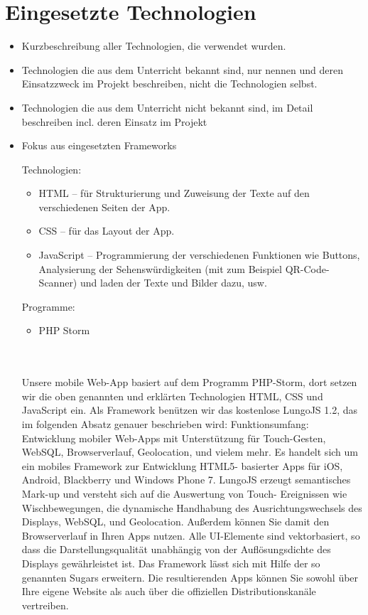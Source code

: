 \chapter{Eingesetzte Technologien}
\begin{itemize}
	\item Kurzbeschreibung aller Technologien, die verwendet wurden.
	\item Technologien die aus dem Unterricht bekannt sind, nur nennen und deren  Einsatzzweck im Projekt beschreiben, nicht die Technologien selbst.
	\item Technologien die aus dem Unterricht nicht bekannt sind, im Detail beschreiben incl. deren Einsatz im Projekt
	\item Fokus aus eingesetzten Frameworks
	
	
	Technologien:
	\begin{itemize}
	\item HTML – für Strukturierung und Zuweisung der Texte auf den verschiedenen Seiten der App.
	\item CSS – für das Layout der App.
	\item JavaScript – Programmierung der verschiedenen Funktionen wie Buttons, Analysierung der Sehenswürdigkeiten (mit zum Beispiel QR-Code-Scanner) und laden der Texte und Bilder dazu, usw.\\
	\end{itemize}

	Programme:
	\begin{itemize}
	\item PHP Storm\\\\\\
	\end{itemize}
	
	Unsere mobile Web-App basiert auf dem Programm PHP-Storm, dort setzen wir die oben genannten und erklärten Technologien HTML, CSS und JavaScript ein. Als Framework benützen wir das kostenlose LungoJS 1.2, das im folgenden Absatz genauer beschrieben wird:
	Funktionsumfang: Entwicklung mobiler Web-Apps mit Unterstützung für Touch-Gesten, WebSQL, Browserverlauf, Geolocation, und vielem mehr.
	Es handelt sich um ein mobiles Framework zur Entwicklung HTML5- basierter Apps für iOS, Android, Blackberry und Windows Phone 7. LungoJS erzeugt semantisches Mark-up und versteht sich auf die Auswertung von Touch- Ereignissen wie Wischbewegungen, die dynamische Handhabung des Ausrichtungswechsels des Displays, WebSQL, und Geolocation. Außerdem können Sie damit den Browserverlauf in Ihren Apps nutzen.
	Alle UI-Elemente sind vektorbasiert, so dass die Darstellungsqualität unabhängig von der Auflösungsdichte des Displays gewährleistet ist. Das Framework lässt sich mit Hilfe der so genannten Sugars erweitern. Die resultierenden Apps können Sie sowohl über Ihre eigene Website als auch über die offiziellen Distributionskanäle vertreiben.
	
\end{itemize}
